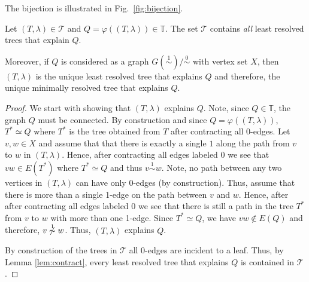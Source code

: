 \documentclass[smallextended]{svjour3}
\newcommand{\rev}[1]{\begingroup\color{blue}#1\endgroup}
\newcommand{\Ro}{\mathrel{\overset{0}{\sim}}}
\newcommand{\Rl}{\mathrel{\overset{1}{\sim}}}
\begin{document}
\rev{The bijection is illustrated in Fig.~\ref{fig:bijection}.}


\rev{
\begin{lemma}
  Let $(T,\lambda) \in \mathcal{T}$ and $Q= \varphi((T,\lambda)) \in \mathbb{T}$.
  The set  $\mathcal{T}$	contains \emph{all} least resolved trees
  that explain $Q$. 

	Moreover, if $Q$
  is considered as a graph \mbox{$G(\Rl)/\Ro$} with vertex set $X$, then
  $(T,\lambda)$ is the unique least resolved tree that explains $Q$
	and therefore, the unique minimally resolved tree that explains $Q$.
	\label{lem:Umin}
\end{lemma}
\begin{proof}
	We start with showing that $(T,\lambda)$ explains $Q$. 
	Note, since $Q\in\mathbb{T}$, the graph $Q$ must be connected. 
	By construction and
	since $Q= \varphi((T,\lambda))$, $T^* \simeq Q$ where $T^*$ is the tree
	obtained from $T$ after contracting all 0-edges. Let $v,w\in X$ and assume
	that that there is exactly a single $1$ along the path from $v$ to $w$ in
	$(T,\lambda)$. Hence, after contracting all edges labeled $0$ we see that
	$vw\in E(T^*)$ where $T^* \simeq Q$ and thus $v\Rl w$. Note, no path between
	any two vertices in $(T,\lambda)$ can have only 0-edges (by construction).
	Thus, assume that there is more than a single 1-edge on the path between $v$
	and $w$. Hence, after after contracting all edges labeled $0$ we see that
	there is still a path in the tree $T^*$ from $v$ to $w$ with more than one
	1-edge. Since $T^* \simeq Q$, we have $vw\not \in E(Q)$ and therefore,
	$v\not\Rl w$. Thus, $(T,\lambda)$ explains $Q$. 

   By construction of the trees in $\mathcal{T}$ all 0-edges
	are incident to a leaf. Thus, by Lemma \ref{lem:contract}, 
	every least resolved tree that explains $Q$ is contained in 
 	$\mathcal{T}$. 


\end{proof}}
\end{document}
